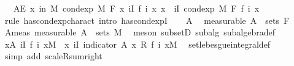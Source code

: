 \begin{isabellebody}
\ \ \ {\isachardoublequoteopen}AE\ x\ in\ M{\isachardot}{\kern0pt}\ cond{\isacharunderscore}{\kern0pt}exp\ M\ F\ {\isacharparenleft}{\kern0pt}{\isasymlambda}x{\isachardot}{\kern0pt}\ {\isasymSum}i{\isasymin}I{\isachardot}{\kern0pt}\ f\ i\ x{\isacharparenright}{\kern0pt}\ x\ {\isacharequal}{\kern0pt}\ {\isacharparenleft}{\kern0pt}{\isasymSum}i{\isasymin}I{\isachardot}{\kern0pt}\ cond{\isacharunderscore}{\kern0pt}exp\ M\ F\ {\isacharparenleft}{\kern0pt}f\ i{\isacharparenright}{\kern0pt}\ x{\isacharparenright}{\kern0pt}{\isachardoublequoteclose}\isanewline
%
\isadelimproof
%
\endisadelimproof
%
\isatagproof
{}\isamarkupfalse%
\ {\isacharparenleft}{\kern0pt}rule\ has{\isacharunderscore}{\kern0pt}cond{\isacharunderscore}{\kern0pt}exp{\isacharunderscore}{\kern0pt}charact{\isacharcomma}{\kern0pt}\ intro\ has{\isacharunderscore}{\kern0pt}cond{\isacharunderscore}{\kern0pt}expI{\isacharprime}{\kern0pt}{\isacharparenright}{\kern0pt}\isanewline
\ \ \isamarkupfalse%
\ A\ \isamarkupfalse%
\ {\isacharbrackleft}{\kern0pt}measurable{\isacharbrackright}{\kern0pt}{\isacharcolon}{\kern0pt}\ {\isachardoublequoteopen}A\ {\isasymin}\ sets\ F{\isachardoublequoteclose}\isanewline
\ \ \isamarkupfalse%
\ \isamarkupfalse%
\ A{\isacharunderscore}{\kern0pt}meas\ {\isacharbrackleft}{\kern0pt}measurable{\isacharbrackright}{\kern0pt}{\isacharcolon}{\kern0pt}\ {\isachardoublequoteopen}A\ {\isasymin}\ sets\ M{\isachardoublequoteclose}\ \isamarkupfalse%
\ {\isacharparenleft}{\kern0pt}meson\ subsetD\ subalg\ subalgebra{\isacharunderscore}{\kern0pt}def{\isacharparenright}{\kern0pt}\isanewline
\isanewline
\ \ \isamarkupfalse%
\ {\isachardoublequoteopen}{\isacharparenleft}{\kern0pt}{\isasymintegral}x{\isasymin}A{\isachardot}{\kern0pt}\ {\isacharparenleft}{\kern0pt}{\isasymSum}i{\isasymin}I{\isachardot}{\kern0pt}\ f\ i\ x{\isacharparenright}{\kern0pt}{\isasympartial}M{\isacharparenright}{\kern0pt}\ {\isacharequal}{\kern0pt}\ {\isacharparenleft}{\kern0pt}{\isasymintegral}x{\isachardot}{\kern0pt}\ {\isacharparenleft}{\kern0pt}{\isasymSum}i{\isasymin}I{\isachardot}{\kern0pt}\ indicator\ A\ x\ {\isacharasterisk}{\kern0pt}\isactrlsub R\ f\ i\ x{\isacharparenright}{\kern0pt}{\isasympartial}M{\isacharparenright}{\kern0pt}{\isachardoublequoteclose}\ \isamarkupfalse%
\ set{\isacharunderscore}{\kern0pt}lebesgue{\isacharunderscore}{\kern0pt}integral{\isacharunderscore}{\kern0pt}def\ \isamarkupfalse%
\ {\isacharparenleft}{\kern0pt}simp\ add{\isacharcolon}{\kern0pt}\ scaleR{\isacharunderscore}{\kern0pt}sum{\isacharunderscore}{\kern0pt}right{\isacharparenright}{\kern0pt}\isanewline

\end{isabellebody}
